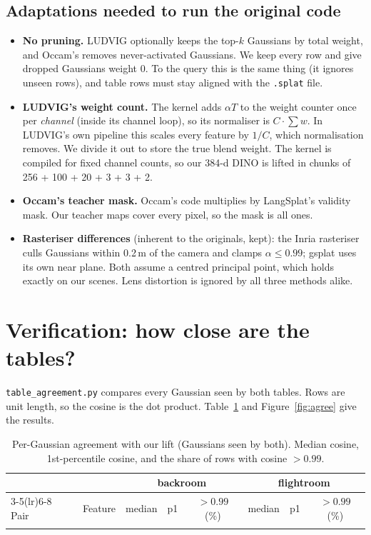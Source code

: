 \documentclass[11pt,a4paper]{article}
\newcommand{\code}[1]{\texttt{\small #1}}
\begin{document}
\subsection{Adaptations needed to run the original code}
\begin{itemize}[leftmargin=*,itemsep=1pt]
  \item \textbf{No pruning.} LUDVIG optionally keeps the top-$k$ Gaussians by total weight, and Occam's removes
        never-activated Gaussians. We keep every row and give dropped Gaussians weight 0. To the query this is the
        same thing (it ignores unseen rows), and table rows must stay aligned with the \code{.splat} file.
  \item \textbf{LUDVIG's weight count.} The kernel adds $\alpha T$ to the weight counter once per \emph{channel} (inside
        its channel loop), so its normaliser is $C\cdot\sum w$. In LUDVIG's own pipeline this scales every feature by
        $1/C$, which normalisation removes. We divide it out to store the true blend weight. The kernel is compiled
        for fixed channel counts, so our 384-d DINO is lifted in chunks of 256 + 100 + 20 + 3 + 3 + 2.
  \item \textbf{Occam's teacher mask.} Occam's code multiplies by LangSplat's validity mask. Our teacher maps cover
        every pixel, so the mask is all ones.
  \item \textbf{Rasteriser differences} (inherent to the originals, kept): the Inria rasteriser culls Gaussians
        within 0.2\,m of the camera and clamps $\alpha\le0.99$; gsplat uses its own near plane. Both assume a centred
        principal point, which holds exactly on our scenes. Lens distortion is ignored by all three methods alike.
\end{itemize}

\section{Verification: how close are the tables?}\label{sec:verify}
\code{table\_agreement.py} compares every Gaussian seen by both tables. Rows are unit length, so the cosine is the
dot product. Table~\ref{tab:agree} and Figure~\ref{fig:agree} give the results.

\begin{table}[h]
\centering\small
\caption{Per-Gaussian agreement with our lift (Gaussians seen by both). Median cosine, 1st-percentile cosine, and the
share of rows with cosine $>0.99$.}
\label{tab:agree}
\begin{tabular}{llcccccc}
\toprule
& & \multicolumn{3}{c}{backroom} & \multicolumn{3}{c}{flightroom}\\
\cmidrule(lr){3-5}\cmidrule(lr){6-8}
Pair & Feature & median & p1 & $>0.99$ (\%) & median & p1 & $>0.99$ (\%)\\
\midrule
{}{tables/agreement.tex}
\bottomrule
\end{tabular}
\end{table}
\end{document}
